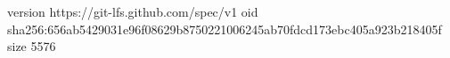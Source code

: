 version https://git-lfs.github.com/spec/v1
oid sha256:656ab5429031e96f08629b8750221006245ab70fdcd173ebc405a923b218405f
size 5576
